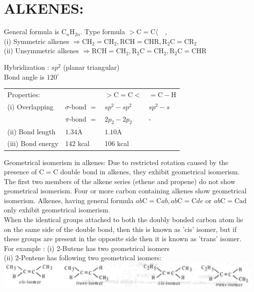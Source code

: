 \documentclass[10pt]{article}
\def\AA{\mathring{\mathrm{A}}}
\begin{document}
\section*{ALKENES:}
General formula is $\mathrm{C}_{n} \mathrm{H}_{2 n}$. Type formula $>\mathrm{C}=\mathrm{C}\langle\quad$,\\
(i) Symmetric alkenes $\Rightarrow \mathrm{CH}_{2}=\mathrm{CH}_{2}, \mathrm{RCH}=\mathrm{CHR}, \mathrm{R}_{2} \mathrm{C}=\mathrm{CR}_{2}$\\
(ii) Unsymmetric alkenes $\Rightarrow \mathrm{RCH}=\mathrm{CH}_{2}, \mathrm{R}_{2} \mathrm{C}=\mathrm{CH}_{2}, \mathrm{R}_{2} \mathrm{C}=\mathrm{CHR}$

Hybridization : $s p^{2}$ (planar triangular)\\
Bond angle is $120^{\circ}$

\begin{center}
\begin{tabular}{llll}
Properties: &  & $>\mathrm{C}=\mathrm{C}<$ & $=\mathrm{C}-\mathrm{H}$ \\
(i) Overlapping & $\sigma$-bond $=$ & $s p^{2}-s p^{2}$ & $s p^{2}-s$ \\
 & $\pi$-bond $=$ & $2 p_{2}-2 p_{2}$ & - \\
(ii) Bond length & $1.34 \AA$ & $1.10 \AA$ &  \\
(iii) Bond energy & 142 kcal & 106 kcal &  \\
\end{tabular}
\end{center}

Geometrical isomerism in alkenes: Due to restricted rotation caused by the presence of $\mathrm{C}=\mathrm{C}$ double bond in alkenes, they exhibit geometrical isomerism.\\
The first two members of the alkene series (ethene and propene) do not show geometrical isomerism. Four or more carbon containing alkenes show geometrical isomerism. Alkenes, having general formula $a b \mathrm{C}=\mathrm{C} a b, a b \mathrm{C}=\mathrm{C} d e$ or $a b \mathrm{C}=\mathrm{Cad}$ only exhibit geometrical isomerism.\\
When the identical groups attached to both the doubly bonded carbon atom lie on the same side of the double bond, then this is known as 'cis' isomer, but if these groups are present in the opposite side then it is known as 'trans' isomer.\\
For example : (i) 2-Butene has two geometrical isomers\\
(ii) 2-Pentene has following two geometrical isomers:\\
\includegraphics[max width=\textwidth, center]{2025_01_28_8470952b98110cec3aabg-176(1)}
\end{document}
